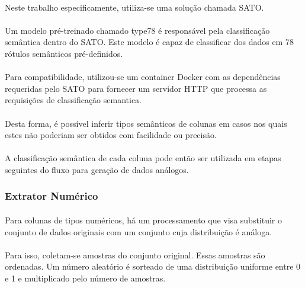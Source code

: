 \paragraph{} Neste trabalho especificamente, utiliza-se uma solução chamada SATO\cite{zhang2019sato}.

\paragraph{} Um modelo pré-treinado chamado type78 é responsável pela classificação semântica dentro do SATO. Este modelo é capaz de classificar dos dados em 78 rótulos semânticos pré-definidos.

\paragraph{} Para compatibilidade, utilizou-se um container Docker com as dependências requeridas pelo SATO para fornecer um servidor HTTP que processa as requisições de classificação semantica.

\paragraph{} Desta forma, é possível inferir tipos semânticos de colunas em casos nos quais estes não poderiam ser obtidos com facilidade ou precisão.

\paragraph{} A classificação semântica de cada coluna pode então ser utilizada em etapas seguintes do fluxo para geração de dados análogos.

\subsubsection{Extrator Numérico}

\paragraph{} Para colunas de tipos numéricos, há um processamento que visa substituir o conjunto de dados originais com um conjunto cuja distribuição é análoga.

\paragraph{} Para isso, coletam-se amostras do conjunto original. Essas amostras são ordenadas. Um número aleatório é sorteado de uma distribuição uniforme entre 0 e 1 e multiplicado pelo número de amostras.

